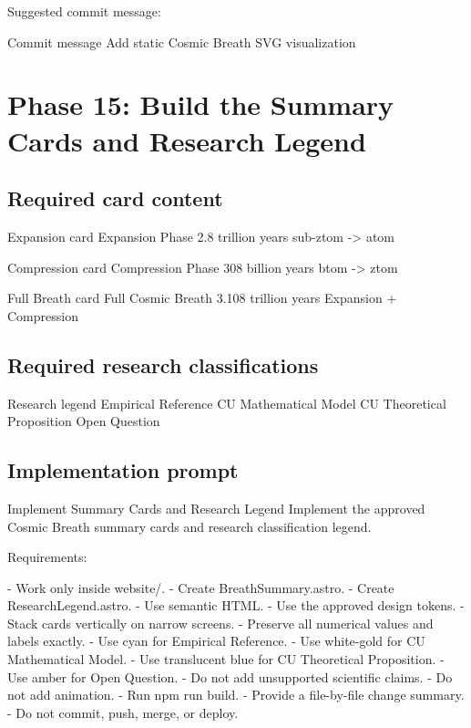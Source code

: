 \documentclass[11pt,letterpaper]{article}
\begin{document}
Suggested commit message:

\begin{codebox}{Commit message}
Add static Cosmic Breath SVG visualization
\end{codebox}

\section{Phase 15: Build the Summary Cards and Research Legend}

\subsection{Required card content}

\begin{codebox}{Expansion card}
Expansion Phase
2.8 trillion years
sub-ztom -> atom
\end{codebox}

\begin{codebox}{Compression card}
Compression Phase
308 billion years
btom -> ztom
\end{codebox}

\begin{codebox}{Full Breath card}
Full Cosmic Breath
3.108 trillion years
Expansion + Compression
\end{codebox}

\subsection{Required research classifications}

\begin{codebox}{Research legend}
Empirical Reference
CU Mathematical Model
CU Theoretical Proposition
Open Question
\end{codebox}

\subsection{Implementation prompt}

\begin{promptbox}{Implement Summary Cards and Research Legend}
Implement the approved Cosmic Breath summary cards and research
classification legend.

Requirements:

- Work only inside website/.
- Create BreathSummary.astro.
- Create ResearchLegend.astro.
- Use semantic HTML.
- Use the approved design tokens.
- Stack cards vertically on narrow screens.
- Preserve all numerical values and labels exactly.
- Use cyan for Empirical Reference.
- Use white-gold for CU Mathematical Model.
- Use translucent blue for CU Theoretical Proposition.
- Use amber for Open Question.
- Do not add unsupported scientific claims.
- Do not add animation.
- Run npm run build.
- Provide a file-by-file change summary.
- Do not commit, push, merge, or deploy.
\end{promptbox}
\end{document}
